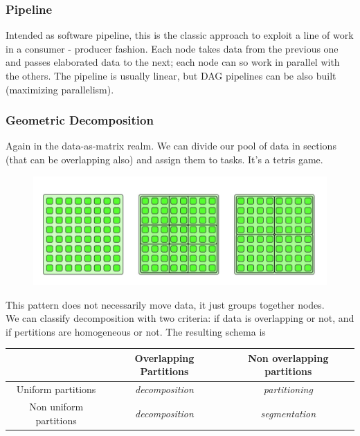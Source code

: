 \documentclass{article}
\begin{document}
			\subsubsection{Pipeline}
				Intended as software pipeline, this is the classic approach to exploit a line of work in a consumer - producer fashion. Each node takes data from the previous one and passes elaborated data to the next; each node can so work in parallel with the others. The pipeline is usually linear, but DAG pipelines can be also built (maximizing parallelism).

			\subsubsection{Geometric Decomposition}
				Again in the data-as-matrix realm. We can divide our pool of data in sections (that can be overlapping also) and assign them to tasks. It's a tetris game.
				\begin{figure}[H]					
					\centering
					\includegraphics[width = \textwidth]{./images/GDec.png}
				\end{figure}
				This pattern does not necessarily move data, it just groups together nodes.\\
				We can classify decomposition with two criteria: if data is overlapping or not, and if pertitions are homogeneous or not. The resulting schema is\\
				\begin{tabular}{c || c | c }
					& Overlapping Partitions & Non overlapping partitions\\
					\hline
					\hline
					Uniform partitions & \textit{decomposition} & \textit{partitioning}\\
					Non uniform partitions & \textit{decomposition} & \textit{segmentation}					
				\end{tabular}
\end{document}
